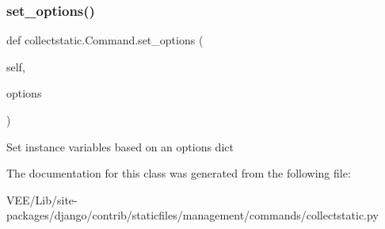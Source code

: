 \subsubsection{\texorpdfstring{set\+\_\+options()}{set\_options()}}
{\footnotesize\ttfamily def collectstatic.\+Command.\+set\+\_\+options (\begin{DoxyParamCaption}\item[{}]{self,  }\item[{}]{options }\end{DoxyParamCaption})}

\begin{DoxyVerb}Set instance variables based on an options dict
\end{DoxyVerb}
 

The documentation for this class was generated from the following file\+:\begin{DoxyCompactItemize}
\item 
V\+E\+E/\+Lib/site-\/packages/django/contrib/staticfiles/management/commands/collectstatic.\+py\end{DoxyCompactItemize}
